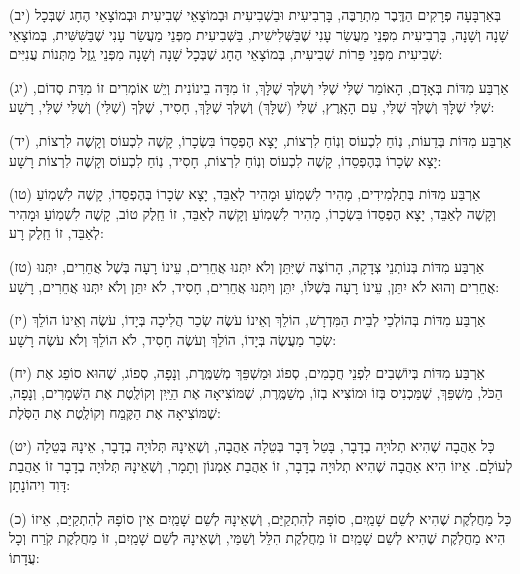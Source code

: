 \documentclass[twoside, openany, parskip=half, 11pt]{book}
\begin{document}
(יב)
 בְּאַרְבָּעָה פְרָקִים הַדֶּֽבֶר מִתְרַבֶּה, בָּרְבִיעִית וּבַשְׁבִיעִית וּבְמוֹצָאֵי שְׁבִיעִית וּבְמוֹצָאֵי הֶחָג שֶׁבְּכָל שָׁנָה וְשָׁנָה, בָּרְבִיעִית מִפְּנֵי מַעֲשַׂר עָנִי שֶׁבַּשְּׁלִישִׁית, בַּשְּׁבִיעִית מִפְּנֵי מַעֲשַׂר עָנִי שֶׁבַּשִּׁשִּׁית, בְּמוֹצָאֵי שְׁבִיעִית מִפְּנֵי פֵּרוֹת שְׁבִיעִית, בְּמוֹצָאֵי הֶחָג שֶׁבְּכָל שָׁנָה וְשָׁנָה מִפְּנֵי גֵֽזֶל מַתְּנוֹת עֲנִיִּים: 

(יג)
 אַרְבַּע מִדּוֹת בְּאָדָם, הָאוֹמֵר שֶׁלִּי שֶׁלִּי וְשֶׁלְּךָ שֶׁלָּךְ, זוֹ מִדָּה בֵינוֹנִית וְיֵשׁ אוֹמְרִים זוֹ מִדַּת סְדוֹם, שֶׁלִּי שֶׁלָּךְ וְשֶׁלְּךָ שֶׁלִּי, עַם הָאָֽרֶץ, שֶׁלִּי (שֶׁלָּךְ) וְשֶׁלְּךָ שֶׁלָּךְ, חָסִיד, שֶׁלְּךָ (שֶׁלִּי) וְשֶׁלִּי שֶׁלִּי, רָשָׁע: 

(יד)
 אַרְבַּע מִדּוֹת בְּדֵעוֹת, נֽוֹחַ לִכְעוֹס וְנֽוֹחַ לִרְצוֹת, יָצָא הֶפְסֵדוֹ בִּשְׂכָרוֹ, קָשֶׁה לִכְעוֹס וְקָשֶׁה לִרְצוֹת, יָצָא שְׂכָרוֹ בְּהֶפְסֵדוֹ, קָשֶׁה לִכְעוֹס וְנֽוֹחַ לִרְצוֹת, חָסִיד, נֽוֹחַ לִכְעוֹס וְקָשֶׁה לִרְצוֹת רָשָׁע: 
 
 (טו)
 אַרְבַּע מִדּוֹת בְּתַלְמִידִים, מָהִיר לִשְׁמֽוֹעַ וּמָהִיר לְאַבֵּד, יָצָא שְׂכָרוֹ בְּהֶפְסֵדוֹ, קָשֶׁה לִשְׁמֽוֹעַ וְקָשֶׁה לְאַבֵּד, יָצָא הֶפְסֵדוֹ בִּשְׂכָרוֹ, מָהִיר לִשְׁמֽוֹעַ וְקָשֶׁה לְאַבֵּד, זוֹ חֵֽלֶק טוֹב, קָשֶׁה לִשְׁמֽוֹעַ וּמָהִיר לְאַבֵּד, זוֹ חֵֽלֶק רָע: 

(טז)
 אַרְבַּע מִדּוֹת בְּנוֹתְנֵי צְדָקָה, הָרוֹצֶה שֶׁיִּתֵּן וְלֹא יִתְּנוּ אֲחֵרִים, עֵינוֹ רָעָה בְּשֶׁל אֲחֵרִים, יִתְּנוּ אֲחֵרִים וְהוּא לֹא יִתֵּן, עֵינוֹ רָעָה בְּשֶׁלּוֹ, יִתֵּן וְיִתְּנוּ אֲחֵרִים, חָסִיד, לֹא יִתֵּן וְלֹא יִתְּנוּ אֲחֵרִים, רָשָׁע: 

(יז)
 אַרְבַּע מִדּוֹת בְּהוֹלְכֵי לְבֵית הַמִּדְרָשׁ, הוֹלֵךְ וְאֵינוֹ עֹשֶׂה שְׂכַר הֲלִיכָה בְּיָדוֹ, עֹשֶׂה וְאֵינוֹ הוֹלֵךְ שְׂכַר מַעֲשֶׂה בְּיָדוֹ, הוֹלֵךְ וְעֹשֶׂה חָסִיד, לֹא הוֹלֵךְ וְלֹא עֹשֶׂה רָשָׁע: 

(יח)
 אַרְבַּע מִדּוֹת בְּיוֹשְׁבִים לִפְנֵי חֲכָמִים, סְפוֹג וּמַשְׁפֵּךְ מְשַׁמֶּֽרֶת, וְנָפָה, סְפוֹג, שֶׁהוּא סוֹפֵג אֶת הַכֹּל, מַשְׁפֵּךְ, שֶׁמַּכְנִיס בְּזוֹ וּמוֹצִיא בְזוֹ, מְשַׁמֶּֽרֶת, שֶׁמּוֹצִיאָה אֶת הַיַּֽיִן וְקוֹלֶֽטֶת אֶת הַשְּׁמָרִים, וְנָפָה, שֶׁמּוֹצִיאָה אֶת הַקֶּֽמַח וְקוֹלֶֽטֶת אֶת הַסֹּֽלֶת: 

(יט)
 כָּל אַהֲבָה שֶׁהִיא תְלוּיָה בְדָבָר, בָּטֵל דָּבָר בְּטֵלָה אַהֲבָה, וְשֶׁאֵינָהּ תְּלוּיָה בְדָבָר, אֵינָהּ בְּטֵלָה לְעוֹלָם. אֵיזוֹ הִיא אַהֲבָה שֶׁהִיא תְלוּיָה בְדָבָר, זוֹ אַהֲבַת אַמְנוֹן וְתָמָר, וְשֶׁאֵינָהּ תְּלוּיָה בְדָבָר זוֹ אַהֲבַת דָּוִד וִיהוֹנָתָן: 


(כ)
 כָּל מַחֲלֹֽקֶת שֶׁהִיא לְשֵׁם שָׁמַֽיִם, סוֹפָהּ לְהִתְקַיַּם, וְשֶׁאֵינָהּ לְשֵׁם שָׁמַֽיִם אֵין סוֹפָהּ לְהִתְקַיַּם, אֵיזוֹ הִיא מַחֲלֹֽקֶת שֶׁהִיא לְשֵׁם שָׁמַֽיִם זוֹ מַחֲלֹֽקֶת הִלֵּל וְשַׁמַּי, וְשֶׁאֵינָהּ לְשֵׁם שָׁמַֽיִם, זוֹ מַחֲלֹֽקֶת קֹֽרַח וְכָל עֲדָתוֹ: 
\end{document}
